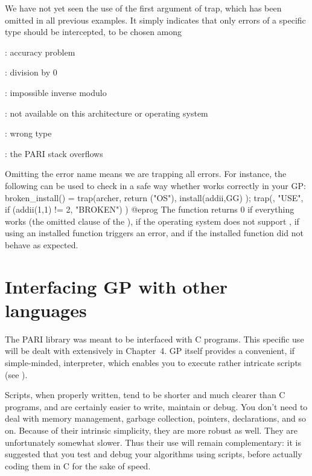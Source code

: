 We have not yet seen the use of the first argument of trap, which has been
omitted in all previous examples. It simply indicates that only errors of a
specific type should be intercepted, to be chosen among

: accuracy problem

: division by 0

: impossible inverse modulo

: not available on this architecture or operating system

: wrong type

: the PARI stack overflows

\noindent Omitting the error name means we are trapping all errors. For
instance, the following can be used to check in a safe way whether
 works correctly in your GP:
\bprog
broken_install() = 
{
  trap(archer, return ("OS"),
    install(addii,GG)
  );
  trap(, "USE",
    if (addii(1,1) != 2, "BROKEN")
  )
}
@eprog
\noindent The function returns 0 if everything works (the omitted 
clause of the ),  if the operating system does not support
,  if using an installed function triggers an error,
and  if the installed function did not behave as expected.

\section{Interfacing GP with other languages}
\noindent
The PARI library was meant to be interfaced with C programs. This specific
use will be dealt with extensively in Chapter~4. GP itself provides a
convenient, if simple-minded, interpreter, which enables you to execute
rather intricate scripts (see ).

Scripts, when properly written, tend to be shorter and much clearer than C
programs, and are certainly easier to write, maintain or debug. You don't
need to deal with memory management, garbage collection, pointers,
declarations, and so on. Because of their intrinsic simplicity, they are more
robust as well. They are unfortunately somewhat slower. Thus their use will
remain complementary: it is suggested that you test and debug your algorithms
using scripts, before actually coding them in C for the sake of speed.


